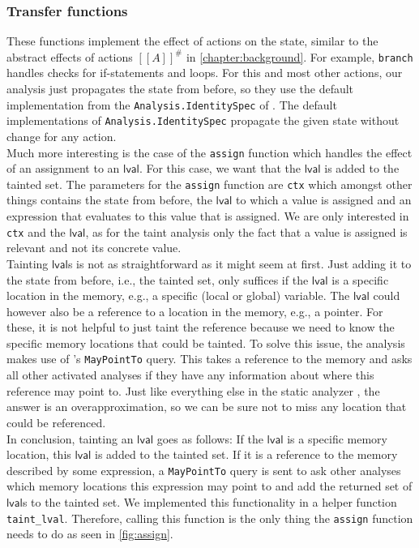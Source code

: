       \subsubsection{Transfer functions}
        These functions implement the effect of actions on the state, similar to the abstract effects of actions $[\![A]\!]^{\#}$ in \autoref{chapter:background}. For example, \texttt{branch} handles checks for if-statements and loops. For this and most other actions, our analysis just propagates the state from before, so they use the default implementation from the \texttt{Analysis.IdentitySpec} of \gob. The default implementations of \texttt{Analysis.IdentitySpec} propagate the given state without change for any action.\\
        Much more interesting is the case of the \texttt{assign} function which handles the effect of an assignment to an $\textsf{lval}$. For this case, we want that the $\textsf{lval}$ is added to the tainted set. The parameters for the \texttt{assign} function are \texttt{ctx} which amongst other things contains the state from before, the $\textsf{lval}$ to which a value is assigned and an expression that evaluates to this value that is assigned. We are only interested in \texttt{ctx} and the $\textsf{lval}$, as for the taint analysis only the fact that a value is assigned is relevant and not its concrete value.\\
        Tainting $\textsf{lval}$s is not as straightforward as it might seem at first. Just adding it to the state from before, i.e., the tainted set, only suffices if the $\textsf{lval}$ is a specific location in the memory, e.g., a specific (local or global) variable. The $\textsf{lval}$ could however also be a reference to a location in the memory, e.g., a pointer. For these, it is not helpful to just taint the reference because we need to know the specific memory locations that could be tainted. To solve this issue, the analysis makes use of \gob's \texttt{MayPointTo} query. This takes a reference to the memory and asks all other activated analyses if they have any information about where this reference may point to. Just like everything else in the static analyzer \gob, the answer is an overapproximation, so we can be sure not to miss any location that could be referenced.\\
        In conclusion, tainting an $\textsf{lval}$ goes as follows: If the $\textsf{lval}$ is a specific memory location, this $\textsf{lval}$ is added to the tainted set. If it is a reference to the memory described by some expression, a \texttt{MayPointTo} query is sent to ask other analyses which memory locations this expression may point to and add the returned set of $\textsf{lval}$s to the tainted set. We implemented this functionality in a helper function \texttt{taint\_lval}. Therefore, calling this function is the only thing the \texttt{assign} function needs to do as seen in \autoref{fig:assign}.


